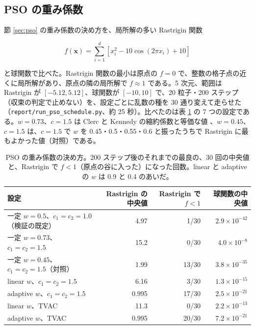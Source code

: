 \documentclass[11pt,a4paper,dvipdfmx]{jsarticle}
\begin{document}
\subsection{PSO の重み係数}\label{sec:val-schedule}

節 \ref{sec:pso} の重み係数の決め方を、局所解の多い Rastrigin 関数

\begin{equation}
  f(\mathbf{x}) = \sum_{i=1}^{d} \left[ x_i^2 - 10 \cos(2\pi x_i) + 10 \right]
\end{equation}

と球関数で比べた。Rastrigin 関数の最小は原点の $f = 0$ で、整数の格子点の近くに局所解があり、原点の隣の局所解で $f \approx 1$ である。5 次元、範囲は Rastrigin が $[-5.12, 5.12]$、球関数が $[-10, 10]$ で、20 粒子・200 ステップ（収束の判定で止めない）を、設定ごとに乱数の種を 30 通り変えて走らせた（\texttt{report/run\_pso\_schedule.py}、約 25 秒）。比べたのは表 \ref{tab:schedule} の 7 つの設定である。$w = 0.73$、$c = 1.5$ は Clerc と Kennedy の縮約係数と等価な値 \cite{clerc2002}、$w = 0.45$、$c = 1.5$ は、$c = 1.5$ で $w$ を 0.45・0.5・0.55・0.6 と振ったうちで Rastrigin に最もよかった値（対照）である。

\begin{table}[h]
\centering
\small
\begin{tabularx}{\linewidth}{Xrrr}
\toprule
設定 & Rastrigin の中央値 & Rastrigin で $f < 1$ & 球関数の中央値 \\
\midrule
一定 $w = 0.5$、$c_1 = c_2 = 1.0$（検証の既定） & 4.97 & 1/30 & $2.9 \times 10^{-42}$ \\
一定 $w = 0.73$、$c_1 = c_2 = 1.5$ & 15.2 & 0/30 & $4.0 \times 10^{-8}$ \\
一定 $w = 0.45$、$c_1 = c_2 = 1.5$（対照） & 1.99 & 13/30 & $3.8 \times 10^{-35}$ \\
linear $w$、$c_1 = c_2 = 1.5$ & 6.16 & 3/30 & $1.3 \times 10^{-15}$ \\
adaptive $w$、$c_1 = c_2 = 1.5$ & 0.995 & 17/30 & $2.5 \times 10^{-21}$ \\
linear $w$、TVAC & 11.3 & 0/30 & $2.2 \times 10^{-13}$ \\
adaptive $w$、TVAC & 0.995 & 20/30 & $7.2 \times 10^{-21}$ \\
\bottomrule
\end{tabularx}
\caption{PSO の重み係数の決め方。200 ステップ後のそれまでの最良の、30 回の中央値と、Rastrigin で $f < 1$（原点の谷に入った）になった回数。linear と adaptive の $w$ は 0.9 と 0.4 のあいだ。}
\label{tab:schedule}
\end{table}
\end{document}
